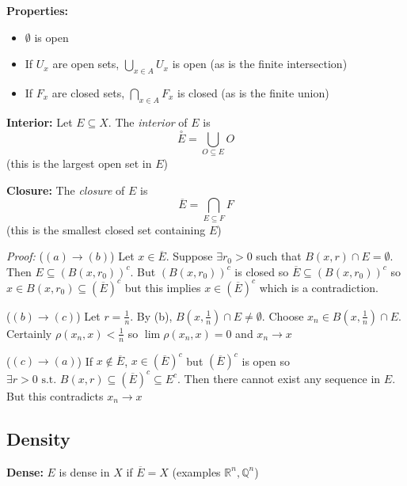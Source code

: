 \documentclass[12pt]{report}
\newcommand{\R}{\mathbb{R}}
\newcommand{\Q}{\mathbb{Q}}
\newcommand{\sub}{\subseteq}
\newcommand{\st}{\text{ s.t. }}
\renewcommand{\bar}[1]{\overline{#1}}
\newenvironment*{tbox}[2][gray]{
    \begin{tcolorbox}[
        parbox=false,
        colback=#1!5!white,
        colframe=#1!75!black,
        breakable,
        title={#2}
    ]}
    {\end{tcolorbox}}
\begin{document}
    \textbf{Properties:}
    \begin{itemize}
        \item $\emptyset$ is open 
        \item If $U_x$ are open sets, $\bigcup_{x \in A} U_x$ is open (as is the finite intersection)
        \item If $F_x$ are closed sets, $\bigcap_{x \in A} F_x$ is closed (as is the finite union)
    \end{itemize}

    \textbf{Interior:} Let $E \sub X$. The \emph{interior} of $E$ is 
    \[\overset{\circ}{E} = \bigcup_{O \sub E} O\]
    (this is the largest open set in $E$)

    \textbf{Closure:} The \emph{closure} of $E$ is
    \[\bar E = \bigcap_{E \sub F} F\]
    (this is the smallest closed set containing $E$)
    
    \begin{tbox}{\textbf{Proposition:} Let $(X, \rho)$ be a metric space. Let $E \sub X$ and $x \in X$. Then the following are equivalent:
        \begin{enumerate}[label=(\alph*)]
            \item $x \in \bar E$
            \item $B(x, r) \cap E \neq \emptyset$ for all $r > 0$
            \item $\exists (x_n) \sub E$ such that $x_n \to x$
        \end{enumerate}}
        \emph{Proof:} 
        ($(a) \to (b)$) Let $x \in \bar E$. Suppose $\exists r_0 >0$ such that $B(x, r) \cap E = \emptyset$. Then $E \sub (B(x, r_0))^c$. But $(B(x, r_0))^c$ is closed so $\bar E \sub (B(x, r_0))^c$ so $x \in B(x, r_0) \sub (\bar E)^c$ but this implies $x \in (\bar E)^c$ which is a contradiction. 

        ($(b) \to (c)$) Let $r = \frac{1}{n}$. By (b), $B(x, \frac{1}{n}) \cap E \neq \emptyset$. Choose $x_n \in B(x, \frac{1}{n}) \cap E$. Certainly $\rho(x_n, x) < \frac{1}{n}$ so $\lim \rho(x_n, x) = 0$ and $x_n \to x$

        ($(c) \to (a)$) If $x \notin \bar E$, $x \in (\bar E)^c$ but $(\bar E)^c$ is open so $\exists r > 0 \st B(x, r) \sub (\bar E)^c \sub E^c$. Then there cannot exist any sequence in $E$. But this contradicts $x_n \to x$
    \end{tbox}

\subsection*{Density}
    \textbf{Dense:} $E$ is dense in $X$ if $\bar E = X$ (examples $\R^n, \Q^n$)
\end{document}
